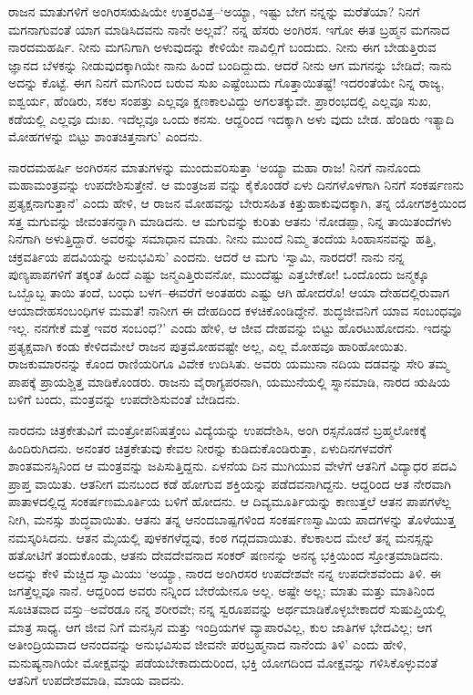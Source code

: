ರಾಜನ ಮಾತುಗಳಿಗೆ ಅಂಗಿರಸಋಷಿಯೇ ಉತ್ತರವಿತ್ತ–‘ಅಯ್ಯಾ, ಇಷ್ಟು ಬೇಗ ನನ್ನನ್ನು ಮರೆತೆಯಾ? ನಿನಗೆ ಮಗನಾಗುವಂತೆ ಯಾಗ ಮಾಡಿಸಿದವನು ನಾನೇ ಅಲ್ಲವೆ? ನನ್ನ ಹೆಸರು ಅಂಗಿರಸ. ಇಗೋ ಈತ ಬ್ರಹ್ಮನ ಮಗನಾದ ನಾರದಮಹರ್ಷಿ. ನೀನು ಮಗನಿಗಾಗಿ ಅಳುವುದನ್ನು ಕೇಳಿಯೇ ನಾವಿಲ್ಲಿಗೆ ಬಂದುದು. ನೀನು ಈಗ ಬೇಡುತ್ತಿರುವ ಜ್ಞಾನದ ಬೆಳಕನ್ನು ನೀಡುವುದಕ್ಕಾಗಿಯೇ ನಾನು ಹಿಂದೆ ಬಂದಿದ್ದುದು. ಆದರೆ ನೀನು ಆಗ ಮಗನನ್ನು ಬೇಡಿದೆ; ನಾನು ಅದನ್ನು ಕೊಟ್ಟೆ. ಈಗ ನಿನಗೆ ಮಗನಿಂದ ಬರುವ ಸುಖ ಎಷ್ಟೆಂಬುದು ಗೊತ್ತಾಯಿತಷ್ಟೆ! ಇದರಂತೆಯೇ ನಿನ್ನ ರಾಜ್ಯ, ಐಶ್ವರ್ಯ, ಹೆಂಡಿರು, ಸಕಲ ಸಂಪತ್ತು ಎಲ್ಲವೂ ಕ್ಷಣಕಾಲವಿದ್ದು ಅಗಲತಕ್ಕುವೇ. ಪ್ರಾರಂಭದಲ್ಲಿ ಎಲ್ಲವೂ ಸುಖ, ಕಡೆಯಲ್ಲಿ ಎಲ್ಲವೂ ದುಃಖ. ಇದೆಲ್ಲವೂ ಒಂದು ಕನಸು. ಆದ್ದರಿಂದ ಇದಕ್ಕಾಗಿ ಅಳು ವುದು ಬೇಡ. ಹೆಂಡಿರು ಇತ್ಯಾದಿ ಮೋಹಗಳನ್ನು ಬಿಟ್ಟು ಶಾಂತಚಿತ್ತನಾಗು’ ಎಂದನು. 

ನಾರದಮಹರ್ಷಿ ಅಂಗಿರಸನ ಮಾತುಗಳನ್ನು ಮುಂದುವರಿಸುತ್ತಾ ‘ಅಯ್ಯಾ ಮಹಾ ರಾಜ! ನಿನಗೆ ನಾನೊಂದು ಮಹಾಮಂತ್ರವನ್ನು ಉಪದೇಶಿಸುತ್ತೇನೆ. ಆ ಮಂತ್ರಜಪ ವನ್ನು ಕೈಕೊಂಡರೆ ಏಳು ದಿನಗಳೊಳಗಾಗಿ ನಿನಗೆ ಸಂಕರ್ಷಣನು ಪ್ರತ್ಯಕ್ಷನಾಗುತ್ತಾನೆ’ ಎಂದು ಹೇಳಿ, ಆ ರಾಜನ ಮೋಹವನ್ನು ಬೇರುಸಹಿತ ಕಿತ್ತುಹಾಕುವುದಕ್ಕಾಗಿ, ತನ್ನ ಯೋಗಶಕ್ತಿಯಿಂದ ಸತ್ತ ಮಗುವನ್ನು ಜೀವಂತನನ್ನಾಗಿ ಮಾಡಿದನು. ಆ ಮಗುವನ್ನು ಕುರಿತು ಆತನು ‘ನೋಡಪ್ಪಾ, ನಿನ್ನ ತಾಯಿತಂದೆಗಳು ನಿನಗಾಗಿ ಅಳುತ್ತಿದ್ದಾರೆ. ಅವರನ್ನು ಸಮಾಧಾನ ಮಾಡು. ನೀನು ಮುಂದೆ ನಿಮ್ಮ ತಂದೆಯ ಸಿಂಹಾಸನವನ್ನು ಹತ್ತಿ, ಚಕ್ರವರ್ತಿಯ ಪದವಿಯನ್ನು ಅನುಭವಿಸು’ ಎಂದನು. ಆದರೆ ಆ ಮಗು ‘ಸ್ವಾಮಿ, ನಾರದರೆ! ನಾನು ನನ್ನ ಪುಣ್ಯಪಾಪಗಳಿಗೆ ತಕ್ಕಂತೆ ಹಿಂದೆ ಎಷ್ಟು ಜನ್ಮಎತ್ತಿರುವನೋ, ಮುಂದೆಷ್ಟು ಎತ್ತಬೇಕೋ! ಒಂದೊಂದು ಜನ್ಮಕ್ಕೂ ಒಬ್ಬೊಬ್ಬ ತಾಯಿ ತಂದೆ, ಬಂಧು ಬಳಗ–ಈವರೆಗೆ ಅಂತಹರು ಎಷ್ಟು ಆಗಿ ಹೋದರೊ! ಆಯಾ ದೇಹದಲ್ಲಿರುವಾಗ ಆಯಾದೇಹಸಂಬಂಧಿಗಳ ಮಮತೆ! ನಾನೀಗ ಈ ದೇಹದಿಂದ ಕಳಚಿಕೊಂಡಿದ್ದೇನೆ. ಶುದ್ಧಜೀವನಿಗೆ ಯಾವ ಸಂಬಂಧವೂ ಇಲ್ಲ. ನನಗೇಕೆ ಮತ್ತೆ ಇವರ ಸಂಬಂಧ?’ ಎಂದು ಹೇಳಿ, ಆ ಜೀವ ದೇಹವನ್ನು ಬಿಟ್ಟು ಹೊರಟುಹೋದನು. ಇದನ್ನು ಪ್ರತ್ಯಕ್ಷವಾಗಿ ಕಂಡು ಕೇಳಿದಮೇಲೆ ರಾಜನ ಪುತ್ರಮೋಹವಷ್ಟೇ ಅಲ್ಲ, ಎಲ್ಲ ಮೋಹವೂ ಹಾರಿಹೋಯಿತು. ರಾಜಕುಮಾರನನ್ನು ಕೊಂದ ರಾಣಿಯರಿಗೂ ವಿವೇಕ ಉದಿಸಿತು. ಅವರು ಯಮುನಾ ನದಿಯ ದಡವನ್ನು ಸೇರಿ ತಮ್ಮ ಪಾಪಕ್ಕೆ ಪ್ರಾಯಶ್ಚಿತ್ತ ಮಾಡಿಕೊಂಡರು. ರಾಜನು ವೈರಾಗ್ಯಪರನಾಗಿ, ಯಮುನೆಯಲ್ಲಿ ಸ್ನಾನಮಾಡಿ, ನಾರದ ಋಷಿಯ ಬಳಿಗೆ ಬಂದು, ಮಂತ್ರವನ್ನು ಉಪದೇಶಿಸುವಂತೆ ಬೇಡಿದನು. 

ನಾರದನು ಚಿತ್ರಕೇತುವಿಗೆ ಮಂತ್ರೋಪನಿಷತ್ತೆಂಬ ವಿದ್ಯೆಯನ್ನು ಉಪದೇಶಿಸಿ, ಅಂಗಿ ರಸ್ಸನೊಡನೆ ಬ್ರಹ್ಮಲೋಕಕ್ಕೆ ಹಿಂದಿರುಗಿದನು. ಅನಂತರ ಚಿತ್ರಕೇತುವು ಕೇವಲ ನೀರನ್ನು ಕುಡಿದುಕೊಂಡಿರುತ್ತಾ, ಏಳುದಿನಗಳವರೆಗೆ ಶಾಂತಮನಸ್ಸಿನಿಂದ ಆ ಮಂತ್ರವನ್ನು ಜಪಿಸುತ್ತಿದ್ದನು. ಏಳನೆಯ ದಿನ ಮುಗಿಯುವ ವೇಳೆಗೆ ಆತನಿಗೆ ವಿದ್ಯಾಧರ ಪದವಿ ಪ್ರಾಪ್ತ ವಾಯಿತು. ಆತನೀಗ ಮನಬಂದ ಕಡೆ ಹೋಗುವ ಶಕ್ತಿಯನ್ನು ಪಡೆದವನಾಗಿದ್ದನು. ಆದ್ದರಿಂದ ಆತ ನೇರವಾಗಿ ಪಾತಾಳದಲ್ಲಿದ್ದ ಸಂಕರ್ಷಣಮೂರ್ತಿಯ ಬಳಿಗೆ ಹೋದನು. ಆ ದಿವ್ಯಮೂರ್ತಿಯನ್ನು ಕಾಣುತ್ತಲೆ ಆತನ ಪಾಪಗಳೆಲ್ಲ ನೀಗಿ, ಮನಸ್ಸು ಶುದ್ಧವಾಯಿತು. ಆತನು ತನ್ನ ಆನಂದಬಾಷ್ಪಗಳಿಂದ ಸಂಕರ್ಷಣಸ್ವಾಮಿಯ ಪಾದಗಳನ್ನು ತೊಳೆಯುತ್ತ ನಮಸ್ಕರಿಸಿದನು. ಆತನ ಮೈಯಲ್ಲಿ ಪುಳಕಗಳೆದ್ದವು, ಕಂಠ ಗದ್ಗದವಾಯಿತು. ಕೆಲಕಾಲದ ಮೇಲೆ ತನ್ನ ಮನಸ್ಸನ್ನು ಹತೋಟಿಗೆ ತಂದುಕೊಂಡು, ಆತನು ದೇವದೇವನಾದ ಸಂಕರ್ ಷಣನನ್ನು ಅನನ್ಯ ಭಕ್ತಿಯಿಂದ ಸ್ತೋತ್ರಮಾಡಿದನು. ಅದನ್ನು ಕೇಳಿ ಮೆಚ್ಚಿದ ಸ್ವಾಮಿಯು ‘ಅಯ್ಯಾ, ನಾರದ ಅಂಗಿರಸರ ಉಪದೇಶವೇ ನನ್ನ ಉಪದೇಶವೆಂದು ತಿಳಿ. ಈ ಜಗತ್ತೆಲ್ಲವೂ ನಾನೆ. ಆದ್ದರಿಂದ ಅವರು ನನ್ನಿಂದ ಬೇರೆಯೇನೂ ಅಲ್ಲ. ಅಷ್ಟೇ ಅಲ್ಲ; ಮಾತು ಮತ್ತು ಮಾತಿನಿಂದ ಸೂಚಿತವಾದ ವಸ್ತು–ಅವೆರಡೂ ನನ್ನ ಶರೀರವೇ; ನನ್ನ ಸ್ವರೂಪವನ್ನು ಅರ್ಥಮಾಡಿಕೊಳ್ಳಬೇಕಾದರೆ ಸುಷುಪ್ತಿಯಲ್ಲಿ ಮಾತ್ರ ಸಾಧ್ಯ. ಆಗ ಜೀವ ನಿಗೆ ಮನಸ್ಸಿನ ಮತ್ತು ಇಂದ್ರಿಯಗಳ ವ್ಯಾಪಾರವಿಲ್ಲ, ಕುಲ ಜಾತಿಗಳ ಭೇದವಿಲ್ಲ; ಆಗ ಅತೀಂದ್ರಿಯವಾದ ಆನಂದವನ್ನು ಅನುಭವಿಸುವ ಜೀವನೇ ಪರಬ್ರಹ್ಮನಾದ ನಾನೆಂದು ತಿಳಿ’ ಎಂದು ಹೇಳಿ, ಮನುಷ್ಯನಾಗಿಯೇ ಮೋಕ್ಷವನ್ನು ಪಡೆಯಬೇಕಾದುದುರಿಂದ, ಭಕ್ತಿ ಯೋಗದಿಂದ ಮೋಕ್ಷವನ್ನು ಗಳಿಸಿಕೊಳ್ಳುವಂತೆ ಆತನಿಗೆ ಉಪದೇಶಮಾಡಿ, ಮಾಯ ವಾದನು.

